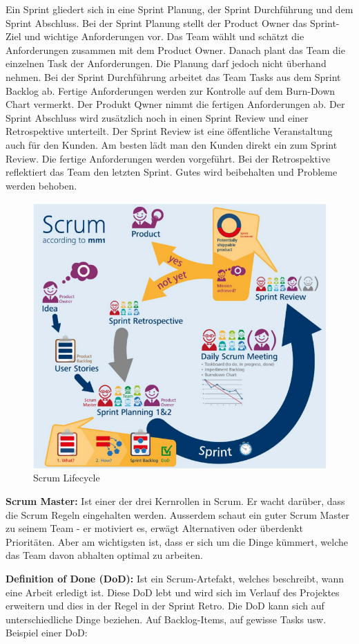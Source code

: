 Ein Sprint gliedert sich in eine Sprint Planung, der Sprint Durchführung und dem Sprint Abschluss. 
Bei der Sprint Planung stellt der Product Owner das Sprint-Ziel und wichtige Anforderungen vor. Das Team wählt und schätzt die Anforderungen zusammen mit dem Product Owner. Danach plant das Team die einzelnen Task der Anforderungen. Die Planung darf jedoch nicht überhand nehmen.
Bei der Sprint Durchführung arbeitet das Team Tasks aus dem Sprint Backlog ab. Fertige Anforderungen werden zur Kontrolle auf dem Burn-Down Chart vermerkt. Der Produkt Qwner nimmt die fertigen Anforderungen ab. 
Der Sprint Abschluss wird zusätzlich noch in einen Sprint Review und einer Retrospektive unterteilt. Der Sprint Review ist eine öffentliche Veranstaltung auch für den Kunden. Am besten lädt man den Kunden direkt ein zum Sprint Review. Die fertige Anforderungen werden vorgeführt. Bei der Retrospektive reflektiert das Team den letzten Sprint. Gutes wird beibehalten und Probleme werden behoben.

\begin{figure}
\centering
\includegraphics[width=0.7\linewidth]{fig/scrum-lifecycle}
\caption{Scrum Lifecycle}
\label{fig:scrum-lifecycle}
\end{figure}

\textbf{Scrum Master:} Ist einer der drei Kernrollen in Scrum. Er wacht darüber, dass die Scrum Regeln eingehalten werden. Ausserdem schaut ein guter Scrum Master zu seinem Team - er motiviert es, erwägt Alternativen oder überdenkt Prioritäten. Aber am wichtigsten ist, dass er sich um die Dinge kümmert, welche das Team davon abhalten optimal zu arbeiten.

\textbf{Definition of Done (DoD):} Ist ein Scrum-Artefakt, welches beschreibt, wann eine Arbeit erledigt ist. Diese DoD lebt und wird sich im Verlauf des Projektes erweitern und dies in der Regel in der Sprint Retro. Die DoD kann sich auf unterschiedliche Dinge beziehen. Auf Backlog-Items, auf gewisse Tasks usw. Beispiel einer DoD:

